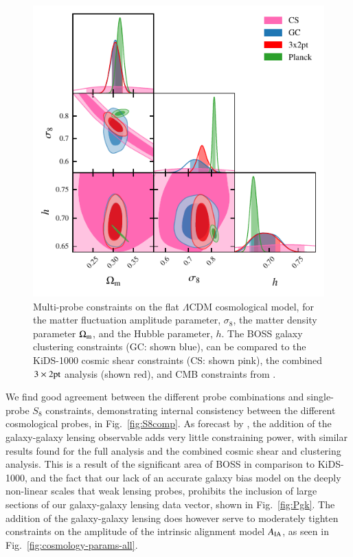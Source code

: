 \begin{figure}
	\begin{center}
		\includegraphics[width=\columnwidth]{Parameter_Plots/cosmology/omegam_sigma8_h_blind_C}
		\caption{Multi-probe constraints on the flat $\Lambda$CDM cosmological model, for the matter fluctuation amplitude parameter, $\sigma_8$, the matter density parameter $\Omega_{\rm m}$, and the Hubble parameter, $h$.  The BOSS galaxy clustering constraints (GC: shown blue), can be compared to the KiDS-1000 cosmic shear constraints (CS: shown pink), the combined $3\times2{\rm pt}$ analysis (shown red), and CMB constraints from \citet{planck/etal:2018}.}
		\label{fig:cosmology-params}
	\end{center}
\end{figure}

We find good agreement between the different probe combinations and single-probe $S_8$ constraints, demonstrating internal consistency between the different cosmological probes, in Fig.~\ref{fig:S8comp}.  
As forecast by \citet{joachimi/etal:inprep}, the addition of the galaxy-galaxy lensing observable adds very little constraining power, with similar results found for the full \tttp analysis and the combined cosmic shear and clustering analysis. 
This is a result of the significant area of BOSS in comparison to KiDS-1000, and the fact that our lack of an accurate galaxy bias model on the deeply non-linear scales that weak lensing probes,
prohibits the inclusion of large sections of our galaxy-galaxy lensing data vector, shown in Fig.~\ref{fig:Pgk}.  
The addition of the galaxy-galaxy lensing does however serve to moderately tighten constraints on the amplitude of the intrinsic alignment model $A_{\rm IA}$,  as seen in Fig.~\ref{fig:cosmology-params-all}. 

